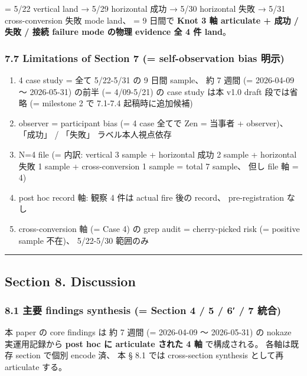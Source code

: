 \documentclass[
]{article}
\providecommand{\tightlist}{%
  \setlength{\itemsep}{0pt}\setlength{\parskip}{0pt}}
\begin{document}
= 5/22 vertical land → 5/29 horizontal 成功 → 5/30 horizontal 失敗 →
5/31 cross-conversion 失敗 mode land、 = 9 日間で \textbf{Knot 3 軸
articulate + 成功 / 失敗 / 接続 failure mode の物理 evidence 全 4 件
land}。

\subsubsection{7.7 Limitations of Section 7 (= self-observation bias
明示)}\label{limitations-of-section-7-self-observation-bias-ux660eux793a}

\begin{enumerate}
\def\labelenumi{\arabic{enumi}.}
\tightlist
\item
  4 case study = 全て 5/22-5/31 の 9 日間 sample、 約 7 週間 (=
  2026-04-09 〜 2026-05-31) の前半 (= 4/09-5/21) の case study は本 v1.0
  draft 段では省略 (= milestone 2 で 7.1-7.4 起稿時に追加候補)
\item
  observer = participant bias (= 4 case 全てで Zen = 当事者 +
  observer)、 「成功」 / 「失敗」 ラベル本人視点依存
\item
  N=4 file (= 内訳: vertical 3 sample + horizontal 成功 2 sample +
  horizontal 失敗 1 sample + cross-conversion 1 sample = total 7
  sample、 但し file 軸 = 4)
\item
  post hoc record 軸: 観察 4 件は actual fire 後の record、
  pre-registration なし
\item
  cross-conversion 軸 (= Case 4) の grep audit = cherry-picked risk (=
  positive sample 不在)、 5/22-5/30 範囲のみ
\end{enumerate}

\begin{center}\rule{0.5\linewidth}{0.5pt}\end{center}

\subsection{Section 8. Discussion}\label{section-8.-discussion}

\subsubsection{8.1 主要 findings synthesis (= Section 4 / 5 / 6′ / 7
統合)}\label{ux4e3bux8981-findings-synthesis-section-4-5-6-7-ux7d71ux5408}

本 paper の core findings は 約 7 週間 (= 2026-04-09 〜 2026-05-31) の
nokaze 実運用記録から \textbf{post hoc に articulate された 4 軸}
で構成される。 各軸は既存 section で個別 encode 済、 本 § 8.1 では
cross-section synthesis として再 articulate する。
\end{document}
